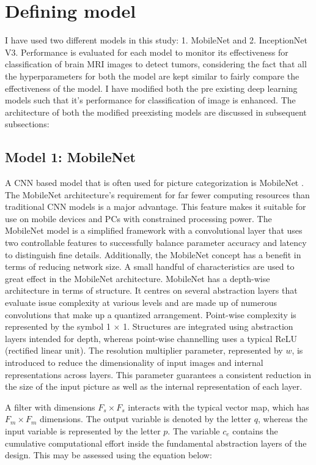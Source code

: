\documentclass[12pt, a4paper,twoside]{report}
\theoremstyle{plain} %
\theoremstyle{definition} %
\theoremstyle{remark} %
\numberwithin{equation}{chapter}
\begin{document}
\section{Defining model}\label{sec:3.4}
I have used two different models in this study: 1. MobileNet and 2. InceptionNet V3. Performance is evaluated for each model to monitor its effectiveness  for classification of brain MRI images to detect tumors, considering the fact that all the hyperparameters for both the model are kept similar to fairly compare the effectiveness of the model. I have modified both the pre existing deep learning models such that it's performance for classification of image is enhanced. The architecture of both the modified pre\-existing models are discussed in subsequent subsections:

\subsection{Model 1: MobileNet}\label{sec:3.4.1}
A CNN based model that is often used for picture categorization is MobileNet \cite{khasoggi2019efficient}. The MobileNet architecture's requirement for far fewer computing resources than traditional CNN models is a major advantage. This feature makes it suitable for use on mobile devices and PCs with constrained processing power. The MobileNet model is a simplified framework with a convolutional layer that uses two controllable features to successfully balance parameter accuracy and latency to distinguish fine details. Additionally, the MobileNet concept has a benefit in terms of reducing network size. A small handful of characteristics are used to great effect in the MobileNet architecture. MobileNet has a depth-wise architecture in terms of structure. It centres on several abstraction layers that evaluate issue complexity at various levels and are made up of numerous convolutions that make up a quantized arrangement. Point-wise complexity is represented by the symbol 1 $\times$ 1. Structures are integrated using abstraction layers intended for depth, whereas point-wise channelling uses a typical ReLU (rectified linear unit). The resolution multiplier parameter, represented by $w$, is introduced to reduce the dimensionality of input images and internal representations across layers. This parameter guarantees a consistent reduction in the size of the input picture as well as the internal representation of each layer.

A filter with dimensions $F_s \times F_s$ interacts with the typical vector map, which has $F_m \times F_m$ dimensions. The output variable is denoted by the letter $q$, whereas the input variable is represented by the letter $p$. The variable $c_e$ contains the cumulative computational effort inside the fundamental abstraction layers of the design. This may be assessed using the equation below:
\end{document}
